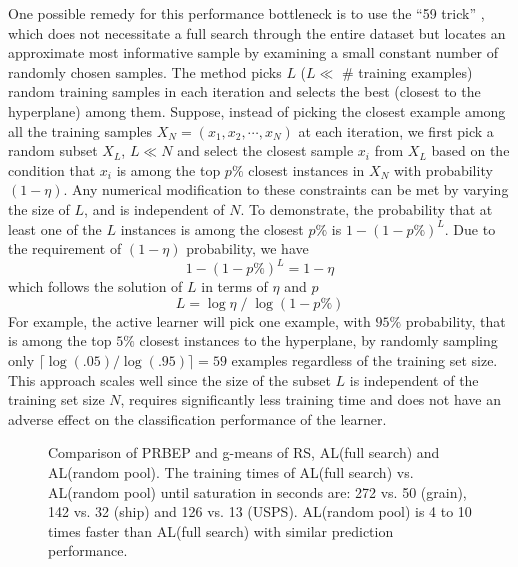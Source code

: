 One possible remedy for this performance bottleneck is to use the ``59 trick'' \cite{Smola_2000}, which does not necessitate a full search through the entire dataset but locates an approximate most informative sample by examining a small constant number of randomly chosen samples. The method picks $L$ ($L \ll$ \# training examples) random training samples in each iteration and selects the best (closest to the hyperplane) among them. Suppose, instead of picking the closest example among all the training samples $X_N=(x_1, x_2, \cdots ,x_N)$ at each iteration, we first pick a random subset $X_L$, $L\ll N$ and select the closest sample $x_i$ from $X_L$ based on the condition that $x_i$ is among the top $p\%$ closest instances in $X_N$ with probability $(1-\eta)$. Any numerical modification to these constraints can be met by varying the size of $L$, and is independent of $N$. To demonstrate, the probability that at least one of the $L$ instances is among the closest $p\%$ is $1-(1-p\%)^L$. Due to the requirement of $(1-\eta)$ probability, we have
\begin{equation}
1-(1-p\%)^L = 1-\eta
\end{equation}
which follows the solution of $L$ in terms of $\eta$ and $p$
\begin{equation}
L={{\log \eta} \;/\;{\log(1-p\%)}}
\end{equation}
For example, the active learner will pick one example, with $95\%$ probability, that is among the top $5\%$ closest instances to the hyperplane, by randomly sampling only $\lceil \log(.05)/\log(.95) \rceil = 59$ examples regardless of the training set size. This approach scales well since the size of the subset $L$ is independent of  the training set size $N$, requires significantly less training time and does not have an adverse effect on the classification performance of the learner.

\begin{figure}[t]
    \centering
    \caption{Comparison of PRBEP and g-means of RS, AL(full search) and AL(random pool). The training times of AL(full search) vs. AL(random pool) until saturation in seconds are: 272 vs. 50 (grain), 142 vs. 32 (ship) and 126 vs. 13 (USPS). AL(random pool) is 4 to 10 times faster than AL(full search) with similar prediction performance.}
    \label{fig:rpal}
\end{figure}

